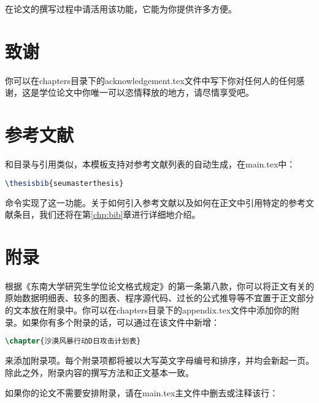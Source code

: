 \noindent 在论文的撰写过程中请活用该功能，它能为你提供许多方便。

\section{致谢}

你可以在chapters目录下的acknowledgement.tex文件中写下你对任何人的任何感谢，这是学位论文中你唯一可以恣情释放的地方，请尽情享受吧。

\section{参考文献}

和目录与引用类似，本模板支持对参考文献列表的自动生成，在main.tex中：

\begin{tcolorbox}
\begin{lstlisting}[language=TeX]
\thesisbib{seumasterthesis}
\end{lstlisting}
\end{tcolorbox}

\noindent 命令实现了这一功能。关于如何引入参考文献以及如何在正文中引用特定的参考文献条目，我们还将在第\ref{chp:bib}章进行详细地介绍。

\section{附录}

根据《东南大学研究生学位论文格式规定》\cite{seugs2023rule}的第一条第八款，你可以将正文有关的原始数据明细表、较多的图表、程序源代码、过长的公式推导等不宜置于正文部分的文本放在附录中。你可以在chapters目录下的appendix.tex文件中添加你的附录。如果你有多个附录的话，可以通过在该文件中新增：

\begin{tcolorbox}
\begin{lstlisting}[language=TeX]
\chapter{沙漠风暴行动D日攻击计划表}
\end{lstlisting}
\end{tcolorbox}

\noindent 来添加附录项。每个附录项都将被以大写英文字母编号和排序，并均会新起一页。除此之外，附录内容的撰写方法和正文基本一致。

如果你的论文不需要安排附录，请在main.tex主文件中删去或注释该行：


